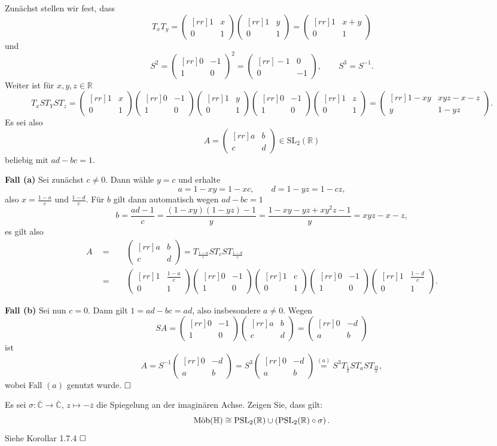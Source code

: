 \documentclass[11pt]{book}
\numberwithin{dummy}{section}
\theoremstyle{nonumberbreak}
\newenvironment{prob}[1][]{\ifthenelse{\equal{#1}{}}{\problem}{\problem[#1]}\rm}{\endproblem}
\newenvironment{sol}[1][]{\ifthenelse{\equal{#1}{}}{\solution}{\solution[#1]}\rm}{\endsolution}
\newcommand{\R}{\mathbb{R}}
\newcommand{\He}{\mathbb{H}}
\newcommand{\CC}{\overline{\mathbb{C}}}
\newcommand{\la}{\longrightarrow}
\newcommand{\amob}{\textup{Möb}}
\newcommand{\matx}[4]{\begin{pmatrix}[rr]#1 & #2 \\[-6pt] #3 & #4 \end{pmatrix}}
\newcommand{\tx}[1]{\begin{pmatrix}[rr]1 & #1 \\[-6pt] 0 & 1 \end{pmatrix}}
\begin{document}
\begin{spacing}{1.4}
\begin{prob}
\begin{sol}
Zunächst stellen wir fest, dass
$$T_x T_y = \tx{x}\tx{y} = \tx{x+y}$$
und 
$$S^2=\matx{0}{-1}{1}{0}^2 = \matx{-1}{0}{0}{-1}, \qquad S^3 = S^{-1}.$$
Weiter ist für $x,y,z \in \R$
$$T_xST_YST_z =  \tx{x} \matx{0}{-1}{1}{0} \tx{y} \matx{0}{-1}{1}{0} \tx{z} = \matx{1-xy}{xyz-x-z}{y}{1-yz}.$$
Es sei also 
$$A=\begin{pmatrix}[rr]a & b \\[-6pt] c & d \end{pmatrix} \in \mathrm{SL}_2(\R)$$
beliebig mit $ad-bc=1$. 
\begin{compactenum}
\item[\textbf{Fall (a)}] Sei zunächst $c \neq 0$. Dann wähle $y=c$ und erhalte
$$a=1-xy = 1-xc, \qquad d=1-yz=1-cz,$$
also $x=\frac{1-a}{c}$ und $\frac{1-d}{c}$. Für $b$ gilt dann automatisch wegen $ad-bc=1$
$$b=\frac{ad-1}{c} = \frac{(1-xy)(1-yz)-1}{y} = \frac{1-xy-yz+xy^2z-1}{y}=xyz-x-z,$$
es gilt also 
\begin{alignat*}{5}
A\ \ &=&& \ \ \matx{a}{b}{c}{d}=T_{\frac{1-a}{c}} S T_c S T_{\frac{1-d}{c}} \\
&=&& \ \ \tx{\frac{1-a}{c}} \matx{0}{-1}{1}{0} \tx{c} \matx{0}{-1}{1}{0} \tx{\frac{1-d}{c}}.
\end{alignat*}

\item[\textbf{Fall (b)}] Sei nun $c=0$. Dann gilt $1=ad-bc=ad$, also insbesondere $a\neq 0$. Wegen 
$$SA= \matx{0}{-1}{1}{0} \matx{a}{b}{c}{d} = \matx{0}{-d}{a}{b}$$
ist 
$$A=S^{-1} \matx{0}{-d}{a}{b} = S^3\matx{0}{-d}{a}{b} \overset{(a)}{=} S^3 T_{\frac{1}{a}} S T_a S T_{\frac{1b}{a}},$$
wobei Fall $(a)$ genutzt wurde. $\hfill \Box$

\end{compactenum}


\end{sol}

\end{prob}






\hypertarget{Adreivier}{}
\begin{prob} %
Es sei $\sigma: \CC \la \CC$, $z \mapsto - \overline{z}$ die Spiegelung an der imaginären Achse. Zeigen Sie, dass gilt:
$$\amob(\He) \cong \mathrm{PSL}_2(\R) \cup \left( \mathrm{PSL}_2(\R) \circ \sigma \right).$$
\begin{sol}
Siehe Korollar 1.7.4 $\hfill \Box$
\end{sol}
\end{prob}



















\end{spacing}
\end{document}
